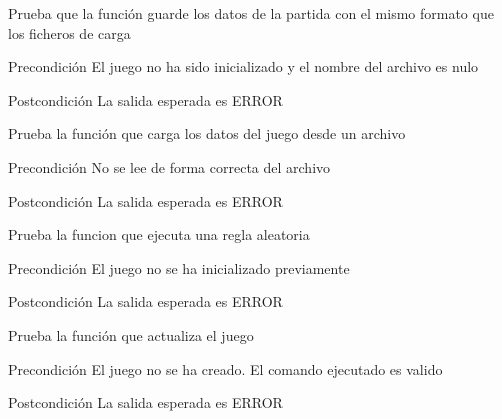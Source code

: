 \begin{DoxyRefList}
\item[\label{test__test000055}%
\hypertarget{test__test000055}{}%
Global \hyperlink{game__management__test_8c_a29bd8e54b3cff03a5130d6c81901573e}{test2\-\_\-game\-\_\-management\-\_\-save} ()]Prueba que la función guarde los datos de la partida con el mismo formato que los ficheros de carga \begin{DoxyPrecond}{Precondición}
El juego no ha sido inicializado y el nombre del archivo es nulo 
\end{DoxyPrecond}
\begin{DoxyPostcond}{Postcondición}
La salida esperada es E\-R\-R\-O\-R  
\end{DoxyPostcond}

\item[\label{test__test000053}%
\hypertarget{test__test000053}{}%
Global \hyperlink{game__management__test_8c_a287603757ed9366d57565da8244f975d}{test2\-\_\-game\-\_\-management\-\_\-start\-\_\-from\-\_\-file} ()]Prueba la función que carga los datos del juego desde un archivo \begin{DoxyPrecond}{Precondición}
No se lee de forma correcta del archivo 
\end{DoxyPrecond}
\begin{DoxyPostcond}{Postcondición}
La salida esperada es E\-R\-R\-O\-R  
\end{DoxyPostcond}

\item[\label{test__test000059}%
\hypertarget{test__test000059}{}%
Global \hyperlink{game__rules__test_8c_a0aa28e920127c3ff413c15e39e97f640}{test2\-\_\-game\-\_\-rules\-\_\-run\-\_\-random\-\_\-rule} ()]Prueba la funcion que ejecuta una regla aleatoria \begin{DoxyPrecond}{Precondición}
El juego no se ha inicializado previamente 
\end{DoxyPrecond}
\begin{DoxyPostcond}{Postcondición}
La salida esperada es E\-R\-R\-O\-R  
\end{DoxyPostcond}

\item[\label{test__test000064}%
\hypertarget{test__test000064}{}%
Global \hyperlink{game__test_8c_aa7c7e1467a24f4d1086096b73a38739e}{test2\-\_\-game\-\_\-update} ()]Prueba la función que actualiza el juego \begin{DoxyPrecond}{Precondición}
El juego no se ha creado. El comando ejecutado es valido 
\end{DoxyPrecond}
\begin{DoxyPostcond}{Postcondición}
La salida esperada es E\-R\-R\-O\-R  
\end{DoxyPostcond}


\end{DoxyRefList}
